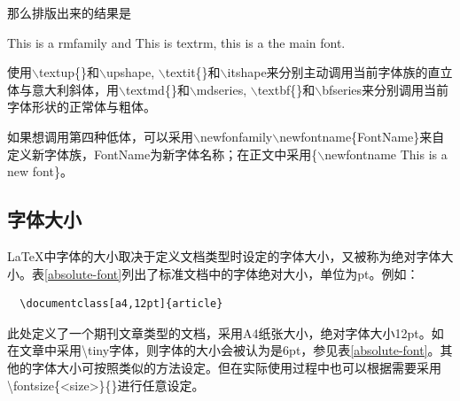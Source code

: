\documentclass[12pt]{book}
\begin{document}
那么排版出来的结果是

{\rmfamily This is a rmfamily and \textrm{This is textrm}}, this is a the main font. %


使用$\backslash$textup\{\}和$\backslash$upshape, $\backslash$textit\{\}和$\backslash$itshape来分别主动调用当前字体族的直立体与意大利斜体，用$\backslash$textmd\{\}和$\backslash$mdseries, $\backslash$textbf\{\}和$\backslash$bfseries来分别调用当前字体形状的正常体与粗体。

如果想调用第四种低体，可以采用$\backslash$newfonfamily$\backslash$newfontname\{FontName\}来自定义新字体族，FontName为新字体名称；在正文中采用\{$\backslash$newfontname This is a new font\}。

\subsection{字体大小}

\LaTeX{}中字体的大小取决于定义文档类型时设定的字体大小，又被称为绝对字体大小。表\ref{absolute-font}列出了标准文档中的字体绝对大小，单位为pt。例如：
\begin{verbatim}
  \documentclass[a4,12pt]{article} 
\end{verbatim}
此处定义了一个期刊文章类型的文档，采用A4纸张大小，绝对字体大小12pt。如在文章中采用\textbackslash tiny字体，则字体的大小会被认为是6pt，参见表\ref{absolute-font}。其他的字体大小可按照类似的方法设定。但在实际使用过程中也可以根据需要采用\textbackslash fontsize\{<size>\}\{<base line-skip>\}进行任意设定。
\end{document}
